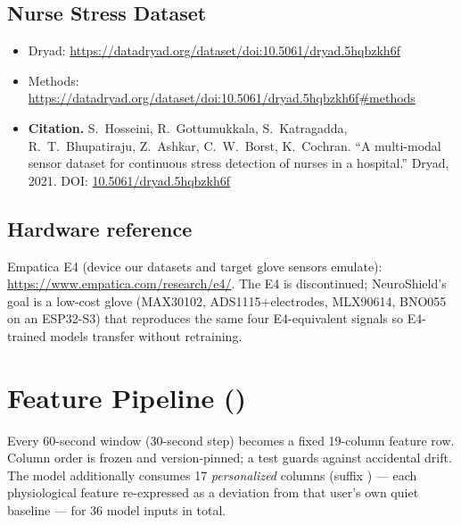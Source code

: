 \documentclass[11pt,a4paper]{article}
\newcommand{\code}{\path}
\begin{document}
\subsection{Nurse Stress Dataset}
\begin{itemize}
\item Dryad: \url{https://datadryad.org/dataset/doi:10.5061/dryad.5hqbzkh6f}
\item Methods: \url{https://datadryad.org/dataset/doi:10.5061/dryad.5hqbzkh6f#methods}
\item \textbf{Citation.} S.\ Hosseini, R.\ Gottumukkala, S.\ Katragadda, R.\ T.\ Bhupatiraju,
Z.\ Ashkar, C.\ W.\ Borst, K.\ Cochran. ``A multi-modal sensor dataset for continuous stress
detection of nurses in a hospital.'' Dryad, 2021.
DOI: \href{https://doi.org/10.5061/dryad.5hqbzkh6f}{10.5061/dryad.5hqbzkh6f}
\end{itemize}

\subsection{Hardware reference}
Empatica E4 (device our datasets and target glove sensors emulate):
\url{https://www.empatica.com/research/e4/}. The E4 is discontinued; NeuroShield's goal is a
low-cost glove (MAX30102, ADS1115+electrodes, MLX90614, BNO055 on an ESP32-S3) that reproduces the
same four E4-equivalent signals so E4-trained models transfer without retraining.

\section{Feature Pipeline (\code{features-v2})}

Every 60-second window (30-second step) becomes a fixed 19-column feature row. Column order is
frozen and version-pinned; a test guards against accidental drift. The model additionally consumes
17 \emph{personalized} columns (suffix \code{\_p}) --- each physiological feature re-expressed as a
deviation from that user's own quiet baseline --- for 36 model inputs in total.
\end{document}
